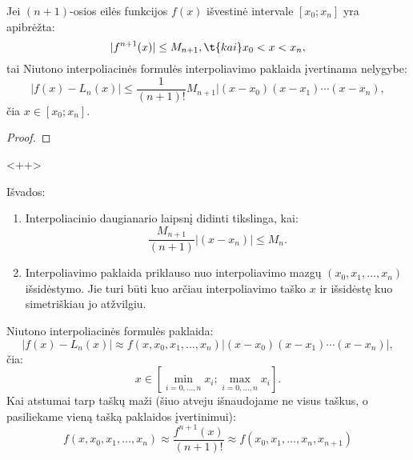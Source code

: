 




\begin{prop}
  Jei $(n+1)$-osios eilės funkcijos $f(x)$ išvestinė intervale
  $\left[ x_{0}; x_{n} \right]$ yra apibrėžta:
  \begin{equation*}
    |f^{n+1}(x)| \leq M_{n+1}, \t{ kai } x_{0} < x < x_{n},
  \end{equation*}
  tai Niutono interpoliacinės formulės interpoliavimo paklaida įvertinama
  nelygybe:
  \begin{equation*}
    |f(x) - L_{n}(x)|
      \leq \frac{1}{(n+1)!}M_{n+1}|(x-x_{0})(x-x_{1})\cdots(x-x_{n}),
  \end{equation*}
  čia $x \in \left[ x_{0}; x_{n} \right]$.
  \begin{proof}
  \end{proof}<++>
\end{prop}
Išvados:
\begin{enumerate}
  \item Interpoliacinio daugianario laipsnį didinti tikslinga, kai:
    \begin{equation*}
      \frac{M_{n+1}}{(n+1)}|(x-x_{n})| \leq M_{n}.
    \end{equation*}
  \item Interpoliavimo paklaida priklauso nuo interpoliavimo mazgų
    $(x_{0},x_{1},\ldots,x_{n})$ išsidėstymo. Jie turi būti kuo arčiau
    interpoliavimo taško $x$ ir išsidėstę kuo simetriškiau jo atžvilgiu.
\end{enumerate}




Niutono interpoliacinės formulės paklaida:
\begin{equation*}
  |f(x) - L_{n}(x)|
    \approx f(x,x_{0},x_{1},\ldots,x_{n})|(x-x_{0})(x-x_{1})\cdots(x-x_{n})|,
\end{equation*}
čia:
\begin{equation*}
  x \in \left[ \min_{i=0,\ldots,n}x_{i}; \max_{i=0,\ldots,n}x_{i} \right].
\end{equation*}
Kai atstumai tarp taškų maži (šiuo atveju išnaudojame ne visus taškus, o
pasiliekame vieną tašką paklaidos įvertinimui):
\begin{equation*}
  f(x,x_{0},x_{1},\ldots,x_{n})
    \approx \frac{f^{n+1}(x)}{(n+1)!}
    \approx f(x_{0},x_{1},\ldots,x_{n},x_{n+1})
\end{equation*}

